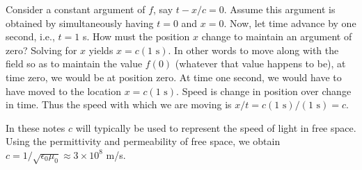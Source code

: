 Consider a constant argument of $f$, say $t - x/c=0$.  Assume this
argument is obtained by simultaneously having $t=0$ and $x=0$.  Now, let
time advance by one second, i.e., $t=1$ s.  How must the position $x$
change to maintain an argument of zero?  Solving for $x$ yields $x=c
(1 \mbox{\ s})$.  In other words to move along with the field so as to
maintain the value $f(0)$ (whatever that value happens to be), at time
zero, we would be at position zero.  At time one second, we would have
to have moved to the location $x=c (1 \mbox{\ s})$.  Speed is change
in position over change in time.  Thus the speed with which we are
moving is $x/t = c (1 \mbox{\ s})/(1 \mbox{\ s}) = c$.

In these notes $c$ will typically be used to represent the speed of
light in free space.  Using the permittivity and permeability of free
space, we obtain $c=1/\sqrt{\epsilon_0\mu_0}\approx 3 \times 10^8$ m/s.
